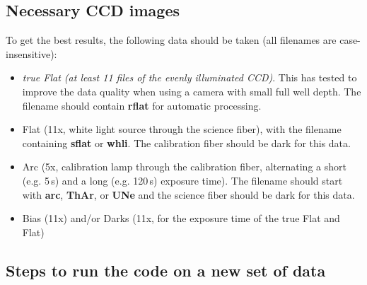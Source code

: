 \documentclass[10pt,a4paper]{article}
\begin{document}
\subsection{Necessary CCD images}
To get the best results, the following data should be taken (all filenames are case-insensitive):
\begin{itemize}
  \item \textit{true Flat (at least 11 files of the evenly illuminated CCD)}. This has tested to improve the data quality when using a camera with small full well depth. The filename should contain \textbf{rflat} for automatic processing.
  \item Flat (11x, white light source through the science fiber), with the filename containing \textbf{sflat} or \textbf{whli}. The calibration fiber should be dark for this data.
  \item Arc (5x, calibration lamp through the calibration fiber, alternating a short (e.g. 5\,s) and a long (e.g. 120\,s) exposure time). The filename should start with \textbf{arc}, \textbf{ThAr}, or \textbf{UNe} and the science fiber should be dark for this data.
  \item Bias (11x) and/or Darks (11x, for the exposure time of the true Flat and Flat)%
\end{itemize}

\subsection{Steps to run the code on a new set of data}
\label{section:steps_new_data_set}
\noindent
\end{document}
